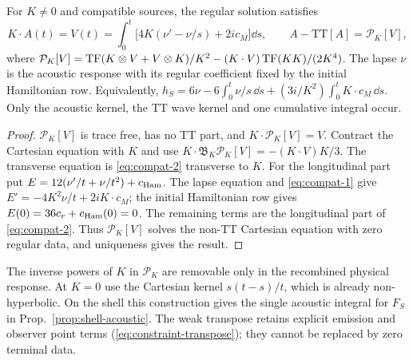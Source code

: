 \begin{proposition}\label{prop:constraint-response}
For $K\neq0$ and compatible sources, the regular solution satisfies
\begin{equation}\label{eq:constraint-response}
 \boxed{K\cdot A(t)=V(t)=\int_0^t\big[4K(\nu'-\nu/s)+2ic_M\big]\dd s,\qquad
 A-\mathrm{TT}[A]=\mathcal P_K[V],}
\end{equation}
where
$\mathcal P_K[V]=\operatorname{TF}(K\otimes V+V\otimes K)/K^2-(K\cdot V)\operatorname{TF}(KK)/(2K^4)$.
The lapse $\nu$ is the acoustic response with its regular coefficient fixed by the initial
Hamiltonian row. Equivalently,
$h_S=6\nu-6\int_0^t\nu/s\,\dd s+(3i/K^2)\int_0^tK\cdot c_M\,\dd s$.
Only the acoustic kernel, the TT wave kernel and one cumulative integral occur.
\end{proposition}
\begin{proof}
$\mathcal P_K[V]$ is trace free, has no TT part, and $K\cdot\mathcal P_K[V]=V$.
Contract the Cartesian equation with $K$ and use
$K\cdot\mathfrak B_K\mathcal P_K[V]=-(K\cdot V)K/3$.
The transverse equation is \eqref{eq:compat-2} transverse to $K$.
For the longitudinal part put $E=12(\nu'/t+\nu/t^2)+c_{\rm Ham}$.
The lapse equation and \eqref{eq:compat-1} give
$E'=-4K^2\nu/t+2iK\cdot c_M$; the initial Hamiltonian row gives
$E(0)=36c_r+c_{\rm Ham}(0)=0$. The remaining terms are the longitudinal part of
\eqref{eq:compat-2}. Thus $\mathcal P_K[V]$ solves the non-TT Cartesian equation with
zero regular data, and uniqueness gives the result.
\end{proof}
The inverse powers of $K$ in $\mathcal P_K$ are removable only in the recombined physical
response. At $K=0$ use the Cartesian kernel $s(t-s)/t$, which is already non-hyperbolic.
On the shell this construction gives the single acoustic integral for $F_S$ in
Prop.~\ref{prop:shell-acoustic}. The weak transpose retains explicit emission and observer
point terms (\eqref{eq:constraint-transpose}); they cannot be replaced by zero terminal data.

